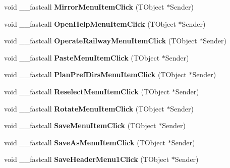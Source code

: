 \begin{DoxyCompactItemize}
void \+\_\+\+\_\+fastcall {\bfseries Mirror\+Menu\+Item\+Click} (T\+Object $\ast$Sender)
\item 
\mbox{\label{class_t_interface_a56469c692fba7afba660312779f40ed3}} 
void \+\_\+\+\_\+fastcall {\bfseries Open\+Help\+Menu\+Item\+Click} (T\+Object $\ast$Sender)
\item 
\mbox{\label{class_t_interface_a472d8ac93d85b4d5605d5bbe39179d5a}} 
void \+\_\+\+\_\+fastcall {\bfseries Operate\+Railway\+Menu\+Item\+Click} (T\+Object $\ast$Sender)
\item 
\mbox{\label{class_t_interface_a4ef96184d97d0f9ff92e78328578e825}} 
void \+\_\+\+\_\+fastcall {\bfseries Paste\+Menu\+Item\+Click} (T\+Object $\ast$Sender)
\item 
\mbox{\label{class_t_interface_a0cd00a2df93531ea1534d280e00e85e0}} 
void \+\_\+\+\_\+fastcall {\bfseries Plan\+Pref\+Dirs\+Menu\+Item\+Click} (T\+Object $\ast$Sender)
\item 
\mbox{\label{class_t_interface_a7d0d3bbfab692ca3d26c1eea6ef24542}} 
void \+\_\+\+\_\+fastcall {\bfseries Reselect\+Menu\+Item\+Click} (T\+Object $\ast$Sender)
\item 
\mbox{\label{class_t_interface_a02e91aba36e2b91354abd2884f658510}} 
void \+\_\+\+\_\+fastcall {\bfseries Rotate\+Menu\+Item\+Click} (T\+Object $\ast$Sender)
\item 
\mbox{\label{class_t_interface_a7699c9c408064623d335d3452b60f289}} 
void \+\_\+\+\_\+fastcall {\bfseries Save\+Menu\+Item\+Click} (T\+Object $\ast$Sender)
\item 
\mbox{\label{class_t_interface_a0be281457630fce07fc19cdbbfde79b1}} 
void \+\_\+\+\_\+fastcall {\bfseries Save\+As\+Menu\+Item\+Click} (T\+Object $\ast$Sender)
\item 
\mbox{\label{class_t_interface_a4f373f26e99a3dc0bc7effc71ca25dc0}} 
void \+\_\+\+\_\+fastcall {\bfseries Save\+Header\+Menu1\+Click} (T\+Object $\ast$Sender)
\item 
\mbox{\label{class_t_interface_a14d8976ee13c85f12eab634de845baf1}} 

\end{DoxyCompactItemize}
